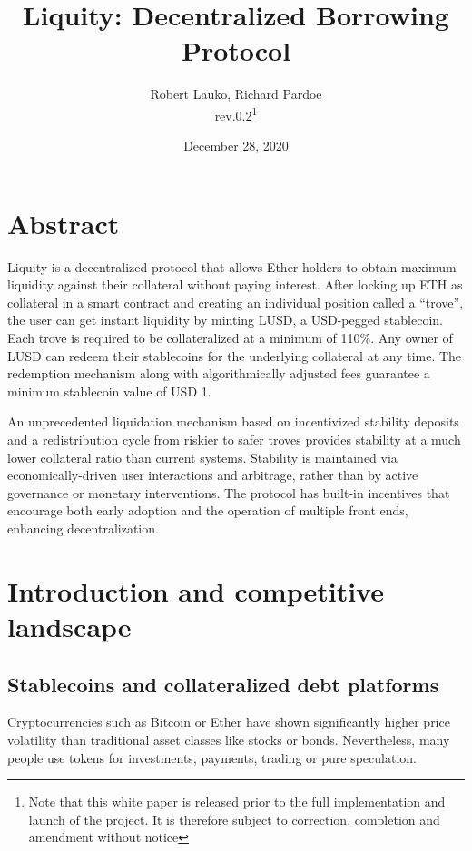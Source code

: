 \documentclass{article}
\begin{document}
\title{\textbf{Liquity: Decentralized Borrowing Protocol}}
\author{Robert Lauko, Richard Pardoe \\ rev.0.2\footnote{Note that this white paper is released prior to the full implementation and launch of the project. It is therefore subject to correction, completion and amendment without notice}}
\date{December 28, 2020}

\maketitle

\section*{Abstract}
Liquity is a decentralized protocol that allows Ether holders to obtain maximum liquidity against their collateral without paying interest. After locking up ETH as collateral in a smart contract and creating an individual position called a “trove”, the user can get instant liquidity by minting LUSD, a USD-pegged stablecoin. Each trove is required to be collateralized at a minimum of 110\%. Any owner of LUSD can redeem their stablecoins for the underlying collateral at any time. The redemption mechanism along with algorithmically adjusted fees guarantee a minimum stablecoin value of USD 1. 

An unprecedented liquidation mechanism based on incentivized stability deposits and a redistribution cycle from riskier to safer troves provides stability at a much lower collateral ratio than current systems. Stability is maintained via economically-driven user interactions and arbitrage, rather than by active governance or monetary interventions. 
The protocol has built-in incentives that encourage both early adoption and the operation of multiple front ends, enhancing decentralization.

\newpage

\tableofcontents

\section{Introduction and competitive landscape}

\subsection{Stablecoins and collateralized debt platforms}
Cryptocurrencies such as Bitcoin or Ether have shown significantly higher price volatility than traditional asset classes like stocks or bonds. Nevertheless, many people use tokens for investments, payments, trading or pure speculation.
\end{document}
